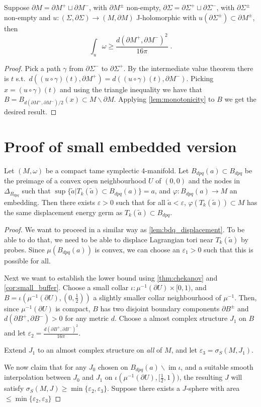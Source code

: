 \documentclass[12pt,a4paper,draft]{scrartcl}
\DeclareMathOperator{\im}{im}
\begin{document}
\begin{corollary}
  \label{cor:small_buffer}
  Suppose $∂M = ∂M^+ ⊔ ∂M^-$, with $∂M^±$ non-empty, $∂Σ = ∂Σ^+ ⊔ ∂Σ^-$, with $∂Σ^±$ non-empty and $u\colon (Σ,∂Σ) → (M,∂M)$ J-holomorphic with $u(∂Σ^±) ⊂ ∂M^±$, then
  \[∫_u ω ≥ \frac{d(∂M^+,∂M^-)^2}{16π} \; .\]
\end{corollary}

\begin{proof}
  Pick a path $γ$ from $∂Σ^-$ to $∂Σ^+$. By the intermediate value theorem there is $t$ s.t.\ $d((u ∘ γ) (t),∂M^+) = d((u ∘ γ)(t), ∂M^-)$. Picking $x = (u ∘ γ)(t)$ and using the triangle inequality we have that $B = B_{d(∂M^+,∂M^-)/2}(x) ⊂ M ∖ ∂M $. Applying \cref{lem:monotonicity} to $B$ we get the desired result.
\end{proof}

\section{Proof of small embedded version}


\begin{theorem}
  Let $(M,ω)$ be a compact tame symplectic 4-manifold. Let $B_{dpq}(a) ⊂ B_{dpq}$ be the preimage of a convex open neighbourhood $U$ of $(0,0)$ and the nodes in $Δ_{B_{dpq}}$ such that $\sup\{\tilde{a} | T_k(\tilde{a}) ⊂ B_{dpq}(a)\} = a$, and $φ \colon B_{dpq}(a) → M$ an embedding. Then there exists $ε>0$ such that for all $\tilde{a}<ε$, $φ(T_k(\tilde{a})) ⊂ M$ has the same displacement energy germ as $T_k(\tilde{a}) ⊂ B_{dpq}$.
\end{theorem}

\begin{proof}
  We want to proceed in a similar way as \cref{lem:bdq_displacement}. To be able to do that, we need to be able to displace Lagrangian tori near $T_k(\tilde{a})$ by probes. Since $μ(B_{dpq}(a))$ is convex, we can choose an $ε_1>0$ such that this is possible for all.

  Next we want to establish the lower bound using \cref{thm:chekanov} and \cref{cor:small_buffer}. Choose a small collar $ι \colon μ^{-1}(∂U) × [0,1)$, and $B = ι(μ^{-1}(∂U), (0,\frac{1}{2}))$ a slightly smaller collar neighbourhood of $μ^{-1}$.
  Then, since $μ^{-1}(∂U)$ is compact, $B$ has two disjoint boundary components $∂B^±$ and $d(∂B^+,∂B^-) > 0$ for any metric $d$.
  Choose a almost complex structure $J_1$ on $B$ and let $ε_2 = \frac{d(∂B^+,∂B^-)^2}{16π}$.
  
  Extend $J_1$ to an almost complex structure on \emph{all} of $M$, and let $ε_3 = σ_S(M,J_1)$.

  We now claim that for any $J_0$ chosen on $B_{dpq}(a) ∖ \im{ι}$, and a suitable smooth interpolation between $J_0$ and $J_1$ on $ι(μ^{-1}(∂U), [\frac{1}{2},1))$, the resulting $J$ will satisfy $σ_S(M,J) ≥ \min\{ε_2,ε_3\}$. Suppose there exists a $J$-sphere with area $≤\min\{ε_2,ε_3\}$

\end{proof}
\end{document}

